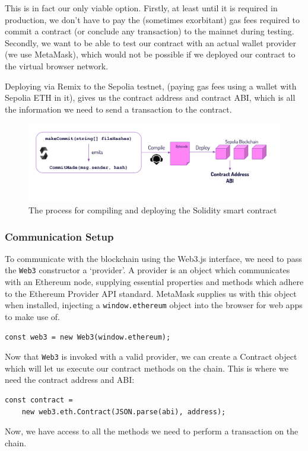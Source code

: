 \documentclass[12pt,a4paper]{article}
\begin{document}
This is in fact our only viable option. Firstly, at least until it is required in production, we don't have to pay the (sometimes exorbitant) gas fees required to commit a contract (or conclude any transaction) to the mainnet during testing. Secondly, we want to be able to test our contract with an actual wallet provider (we use MetaMask), which would not be possible if we deployed our contract to the virtual browser network.

Deploying via Remix to the Sepolia testnet, (paying gas fees using a wallet with Sepolia ETH in it), gives us the contract address and contract ABI, which is all the information we need to send a transaction to the contract. 
\begin{figure}[H]
    \centering
    \includegraphics[scale=0.6]{deploy.png}
    \caption{The process for compiling and deploying the Solidity smart contract}
\end{figure}
\subsubsection{Communication Setup}
To communicate with the blockchain using the Web3.js interface, we need to pass the \verb|Web3| constructor a `provider'.
A provider is an object which communicates with an Ethereum node, supplying essential properties and methods which adhere to the Ethereum Provider API standard. MetaMask supplies us with this object when installed, injecting a \verb|window.ethereum| object into the browser for web apps to make use of.
\begin{lstlisting}
const web3 = new Web3(window.ethereum);
\end{lstlisting}
Now that \verb|Web3| is invoked with a valid provider, we can create a Contract object which will let us execute our contract methods on the chain. This is where we need the contract address and ABI:
\begin{lstlisting}
const contract = 
    new web3.eth.Contract(JSON.parse(abi), address);
\end{lstlisting}
Now, we have access to all the methods we need to perform a transaction on the chain.
\end{document}
